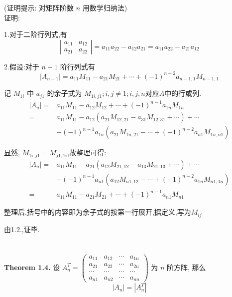 \documentclass[]{ctexart}
\begin{document}
(证明提示: 对矩阵阶数 $n$ 用数学归纳法)\\

\noindent 证明:

1.对于二阶行列式,有
$$
\left|\begin{array}{ll}
	a_{11} & a_{12} \\
	a_{21} & a_{22}
\end{array}\right|
=a_{11} a_{22}-a_{12} a_{21}
=a_{11} a_{22}-a_{21} a_{12}
$$

2.假设:对于 $n-1$ 阶行列式有
$$
\left|A_{n-1}\right|=a_{11} M_{11}-a_{21} M_{21}+\cdots+(-1)^{n-2} a_{n-1, 1} M_{n-1, 1}
$$

记 $M_{1i}$ 中 $a_{j1}$ 的余子式为 $M_{1i,j1};i,j\neq 1;i,j,n$对应$A$中的行或列.
$$
\begin{aligned}
	\left|A_{n}\right|=&a_{11} M_{11}-a_{12} M_{12}+\cdots+(-1)^{n-1} a_{1 n} M_{1 n} \\
	=&a_{11} M_{11}-a_{12}\left( a_{21}M_{12,21}-a_{31}M_{12,31}+\cdots\right)+\cdots\\
	&+(-1)^{n-1} a_{1n} \left( a_{21}M_{1n,21}-\cdots+(-1)^{n-2}a_{n1}M_{1n,n1}\right)
\end{aligned}
$$

显然, $M_{1i,j1}=M_{j1,1i}$,故整理可得:
$$
\begin{aligned}
	\left|A_{n}\right|=&a_{11} M_{11}-a_{21}\left(a_{12}M_{21,12}-a_{13}M_{21,13}+\cdots\right)+\cdots\\
	&+(-1)^{n-1} a_{n1} \left( a_{12}M_{n1,12}-\cdots+(-1)^{n-2}a_{1n}M_{n1,1n}\right)\\
	=&a_{11} M_{11}-a_{21} M_{21}+\cdots+(-1)^{n-1} a_{n 1} M_{n 1}
\end{aligned}
$$

整理后,括号中的内容即为余子式的按第一行展开,据定义,写为$M_{ij}$

由1.2.,证毕.

\section*{}

\noindent\textbf{Theorem 1.4.} 设
$A^{T}_{n}=\left(\begin{array}{cccc}
	a_{11} & a_{12} & \cdots & a_{1 n} \\
	a_{21} & a_{22} & \cdots & a_{2 n} \\
	\cdots & \cdots & \cdots & \cdots \\
	a_{n 1} & a_{n 2} & \cdots & a_{n n}
\end{array}\right)$
为 $n$ 阶方阵, 那么
$$
\left|A_{n}\right|=\left|A_{n}^{T}\right|
$$
\end{document}
